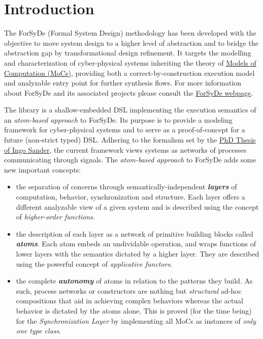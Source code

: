 \section{Introduction}
\label{sec:forsyde-atom:introduction}

The ForSyDe (Formal System Design) methodology has been developed
with the objective to move system design to a higher level of
abstraction and to bridge the abstraction gap by transformational
design refinement. It targets the modelling and characterization of
cyber-physical systems inheriting the theory of
\href{http://ieeexplore.ieee.org/stamp/stamp.jsp?arnumber=736561}{Models of Computation (MoCs)},
providing both a correct-by-construction execution model and
analyzable entry point for further synthesis flows. For more information
about ForSyDe and its associated projects please consult the
\href{https://github.com/forsyde}{ForSyDe webpage}.\par
The  library is a shallow-embedded DSL implementing
the execution semantics of an \emph{atom-based approach} to ForSyDe. Its
purpose is to provide a modeling framework for cyber-physical
systems and to serve as a proof-of-concept for a future (non-strict
typed) DSL. Adhering to the formalism set by the
\href{http://www.diva-portal.org/smash/get/diva2:9340/FULLTEXT01.pdf}{PhD Thesis of Ingo Sander},
the current framework views systems as networks of processes
communicating through signals. The \emph{atom-based approach} to ForSyDe
adds some new important concepts:\par
\begin{itemize}
\item
the separation of concerns through semantically-independent
\textbf{\emph{layers}} of computation, behavior, synchronization and
structure. Each layer offers a different analyzable view of a
given system and is described using the concept of
\emph{higher-order functions}.\par

\item
the description of each layer as a network of primitive building
blocks called \textbf{\emph{atoms}}. Each atom embeds an undividable operation,
and wraps functions of lower layers with the semantics dictated by
a higher layer. They are described using the powerful concept of
\emph{applicative functors}.\par

\item
the complete \textbf{\emph{autonomy}} of atoms in relation to the patterns
they build. As such, process networks or constructors are nothing
but \emph{structural} ad-hoc compositions that aid in achieving complex
behaviors whereas the actual behavior is dictated by the atoms
alone. This is proved (for the time being) for the
\emph{Synchronization Layer} by implementing all MoCs as instances of
\emph{only one type class}.\par

\end{itemize}


